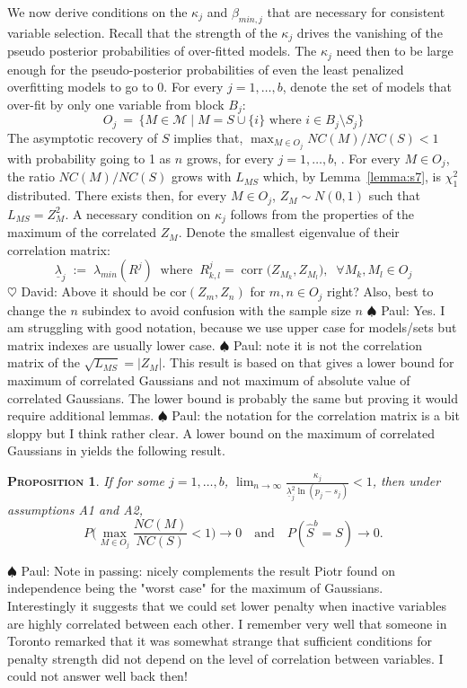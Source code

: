 \documentclass[aos]{imsart}
\theoremstyle{plain}
\newtheorem{prop}{\textsc{Proposition}}[section]
\newcommand{\david}[1]{{\small{\color{blue} \sf $\heartsuit$ David: #1}}}
\newcommand{\paul}[1]{{\small{\color{green} \sf $\spadesuit$ Paul: #1}}}
\newcommand{\M}{\mathcal{M}}
\begin{document}
We now derive conditions on the $\kappa_j$ and $\beta_{min,j}$ that are necessary for consistent variable selection. Recall that the strength of the $\kappa_j$ drives the vanishing of the pseudo posterior probabilities of over-fitted models. The $\kappa_j$ need then to be large enough for the pseudo-posterior probabilities of even the least penalized overfitting models to go to 0. For every $j=1,\ldots,b$, denote the set of models that over-fit by only one variable from block $B_j$:
$$O_j \:=\,\{M\in \M\;|\; M=S\cup\{i\} \text{ where } i\in B_j\setminus S_j\}$$
The asymptotic recovery of $S$ implies that, $\max_{M\in O_j}NC(M)/NC(S)<1$ with probability going to 1 as $n$ grows, for every $j=1,\ldots,b$, . For every $M\in O_j$, the ratio $NC(M)/NC(S)$ grows with $L_{MS}$ which, by Lemma~\ref{lemma:s7}, is $\chi^2_1$ distributed. There exists then, for every $M\in O_j$, $Z_M \sim N(0,1)$ such that $L_{MS}=Z_M^2$. A necessary condition on $\kappa_j$ follows from the properties of the maximum of the correlated $Z_M$. Denote the smallest eigenvalue of their correlation matrix:
\begin{equation}
    \underline{\lambda}_j\;:=\;\lambda_{min}(R^j)\;\;\text{where} \;\;R^j_{k,l}=\operatorname{corr}\big(Z_{M_k},Z_{M_l}\big),\;\;\forall M_k,M_l \in O_j
\end{equation}
\david{Above it should be $\mbox{cor}(Z_m,Z_n)$ for $m,n \in O_j$ right? Also, best to change the $n$ subindex to avoid confusion with the sample size $n$}\paul{Yes. I am struggling with good notation, because we use upper case for models/sets but matrix indexes are usually lower case.}
\paul{note it is not the correlation matrix of the $\sqrt{L_{MS}}=|Z_M|$. This result is based on \cite{hartigan} that gives a lower bound for maximum of correlated Gaussians and not maximum of absolute value of correlated Gaussians. The lower bound is probably the same but proving it would require additional lemmas.}
\paul{the notation for the correlation matrix is a bit sloppy but I think rather clear.}
A lower bound on the maximum of correlated Gaussians in \cite{hartigan} yields the following result.
\begin{prop}\label{prop:nectypeIreg}
     If for some $j=1,\ldots,b$,  $\lim_{n\to\infty}\frac{\kappa_j}{\underline{\lambda}_j^2\ln(p_j-s_j)} <1$, then under assumptions A1 and A2, $$P\Big(\max_{M\in O_j}\frac{NC(M)}{NC(S)}<1\Big)\to 0 \quad\text{and}\quad P(\hat{S}^b=S) \to 0.$$
\end{prop}

\paul{Note in passing: \cite{hartigan} nicely complements the result Piotr found on independence being the "worst case" for the maximum of Gaussians.\\
Interestingly it suggests that we could set lower penalty when inactive variables are highly correlated between each other. I remember very well that someone in Toronto remarked that it was somewhat strange that sufficient conditions for penalty strength did not depend on the level of correlation between variables. I could not answer well back then!}
\end{document}
